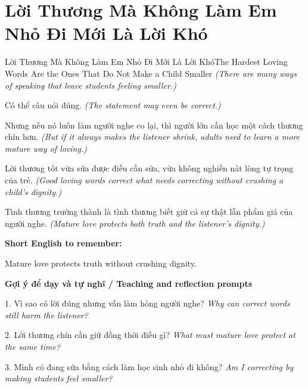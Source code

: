 \section{Lời Thương Mà Không Làm Em Nhỏ Đi Mới Là Lời Khó}
\begin{truyen}{Lời Thương Mà Không Làm Em Nhỏ Đi Mới Là Lời Khó}{The Hardest Loving Words Are the Ones That Do Not Make a Child Smaller}
\textit{(There are many ways of speaking that leave students feeling smaller.)}

Có thể câu nói đúng.
\textit{(The statement may even be correct.)}

Nhưng nếu nó luôn làm người nghe co lại, thì người lớn cần học một cách thương chín hơn.
\textit{(But if it always makes the listener shrink, adults need to learn a more mature way of loving.)}

Lời thương tốt vừa sửa được điều cần sửa, vừa không nghiền nát lòng tự trọng của trẻ.
\textit{(Good loving words correct what needs correcting without crushing a child's dignity.)}

\end{truyen}

\begin{baihoc}
Tình thương trưởng thành là tình thương biết giữ cả sự thật lẫn phẩm giá của người nghe.
\textit{(Mature love protects both truth and the listener's dignity.)}
\end{baihoc}

\begin{ghinhoanh}
\textbf{Short English to remember:}

Mature love protects truth without crushing dignity.

\end{ghinhoanh}

\begin{tuhocnhanh}
\textbf{Gợi ý để dạy và tự nghĩ / Teaching and reflection prompts}

1. Vì sao có lời đúng nhưng vẫn làm hỏng người nghe? \textit{Why can correct words still harm the listener?}

2. Lời thương chín cần giữ đồng thời điều gì? \textit{What must mature love protect at the same time?}

3. Mình có đang sửa bằng cách làm học sinh nhỏ đi không? \textit{Am I correcting by making students feel smaller?}
\end{tuhocnhanh}
\ngancach

